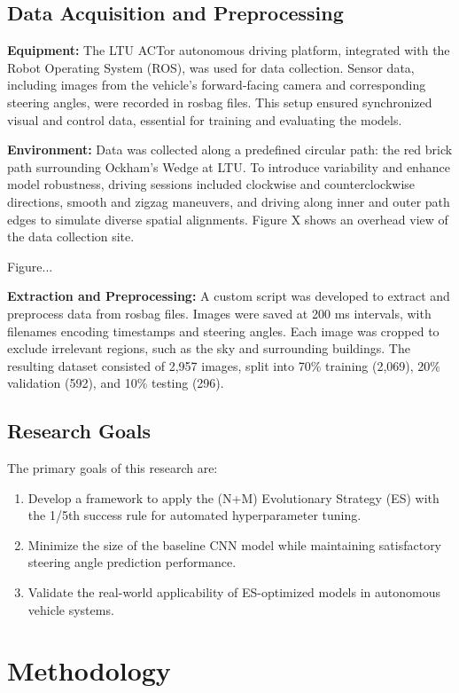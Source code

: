 \documentclass[conference]{IEEEtran}
\begin{document}
\subsection{Data Acquisition and Preprocessing}

\textbf{Equipment:} The LTU ACTor autonomous driving platform, integrated with the Robot Operating System (ROS), was used for data collection. Sensor data, including images from the vehicle's forward-facing camera and corresponding steering angles, were recorded in rosbag files. This setup ensured synchronized visual and control data, essential for training and evaluating the models.

\textbf{Environment:} Data was collected along a predefined circular path: the red brick path surrounding Ockham's Wedge at LTU. To introduce variability and enhance model robustness, driving sessions included clockwise and counterclockwise directions, smooth and zigzag maneuvers, and driving along inner and outer path edges to simulate diverse spatial alignments.  Figure X shows an overhead view of the data collection site.

Figure...

\textbf{Extraction and Preprocessing:} A custom script was developed to extract and preprocess data from rosbag files. Images were saved at 200 ms intervals, with filenames encoding timestamps and steering angles. Each image was cropped to exclude irrelevant regions, such as the sky and surrounding buildings. The resulting dataset consisted of 2,957 images, split into 70\% training (2,069), 20\% validation (592), and 10\% testing (296).

\subsection{Research Goals}

The primary goals of this research are:
\begin{enumerate}
    \item Develop a framework to apply the (N+M) Evolutionary Strategy (ES) with the 1/5th success rule for automated hyperparameter tuning.
    \item Minimize the size of the baseline CNN model while maintaining satisfactory steering angle prediction performance.
    \item Validate the real-world applicability of ES-optimized models in autonomous vehicle systems.
\end{enumerate}

\section{Methodology}
\end{document}
